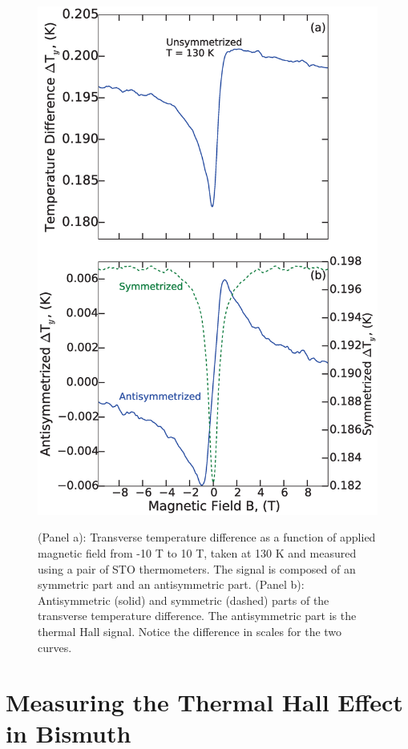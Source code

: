 \documentclass{thesis-umich}
\begin{document}
  \begin{figure} \caption[Transverse temperature gradient of a bismuth crystal]{(Panel a): Transverse temperature difference as a
    function of applied magnetic field from -10 T to 10 T, taken at 130 K and
    measured using a pair of STO thermometers. The signal is composed of an
    symmetric part and an antisymmetric part.  (Panel b): Antisymmetric (solid)
  and symmetric (dashed) parts of the transverse temperature difference. The
antisymmetric part is the thermal Hall signal. Notice the difference in scales
for the two curves.} \centering\label{t_grad}
\includegraphics[width=0.9\columnwidth]{figures/rawCurve_apl.eps} \end{figure}

\section{Measuring the Thermal Hall Effect in Bismuth}
\end{document}
